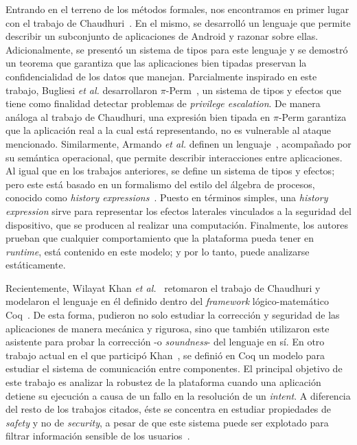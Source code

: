 Entrando en el terreno de los métodos formales, nos encontramos en primer lugar
con el trabajo de Chaudhuri~\cite{chaudhuri}. En el mismo, se desarrolló un
lenguaje que permite describir un subconjunto de aplicaciones de Android y
razonar sobre ellas. Adicionalmente, se presentó un sistema de tipos para este
lenguaje y se demostró un teorema que garantiza que las aplicaciones bien
tipadas preservan la confidencialidad de los datos que manejan. Parcialmente
inspirado en este trabajo, Bugliesi \textit{et al.} desarrollaron
$\pi$-Perm~\cite{bugliesi}, un sistema de tipos y efectos que tiene como
%
%
finalidad detectar problemas de \textit{privilege escalation}. De manera análoga
al trabajo de Chaudhuri, una expresión bien tipada en $\pi$-Perm garantiza que
la aplicación real a la cual está representando, no es vulnerable al ataque
mencionado. Similarmente, Armando \textit{et al.} definen un
lenguaje~\cite{armando}, acompañado por su semántica operacional, que permite
describir interacciones entre aplicaciones. Al igual que en los trabajos
anteriores, se define un sistema de tipos y efectos; pero este está basado en un
formalismo del estilo del álgebra de procesos, conocido como \textit{history
expressions}~\cite{history-expressions}. Puesto en términos simples, una
\textit{history expression} sirve para representar los efectos laterales
vinculados a la seguridad del dispositivo, que se producen al realizar una
computación. Finalmente, los autores prueban que cualquier comportamiento que la
plataforma pueda tener en \textit{runtime}, está contenido en este modelo; y por
lo tanto, puede analizarse estáticamente.

Recientemente, Wilayat Khan \textit{et al.}~\cite{khan} retomaron el trabajo de Chaudhuri y
modelaron el lenguaje en él definido dentro del \textit{framework}
lógico-matemático Coq~\cite{coq}. De esta forma, pudieron no solo estudiar la
corrección y seguridad de las aplicaciones de manera mecánica y rigurosa, sino
que también utilizaron este asistente para probar la corrección -o
\textit{soundness}- del lenguaje en sí. En otro trabajo actual en el que participó
Khan~\cite{crashsafe}, se definió en Coq un modelo para estudiar el sistema de
comunicación entre componentes. El principal objetivo de este trabajo es
analizar la robustez de la plataforma cuando una aplicación detiene su ejecución
a causa de un fallo en la resolución de un \textit{intent}. A diferencia del
resto de los trabajos citados, éste se concentra en estudiar propiedades de
\textit{safety} y no de \textit{security}, a pesar de que este sistema puede ser
explotado para filtrar información sensible de los usuarios~\cite{iccta}.


